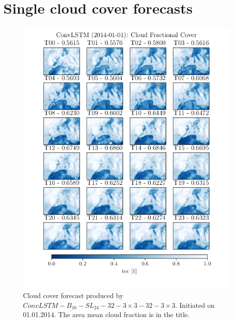 \cleardoublepage
\section{Single cloud cover forecasts}
\begin{figure}
    \centering
    \includegraphics[scale =0.85]{python_figs/timelapse_convlstm_24hrs_from_2014-01-01.png}
    \caption{Cloud cover forecast produced by $ConvLSTM-B_{10}-SL_{24}-32-3\times3-32-3\times3$. Initiated on 01.01.2014. The area mean  cloud fraction is in the title.}
    \label{fig:timelapse_3x3}
\end{figure}
